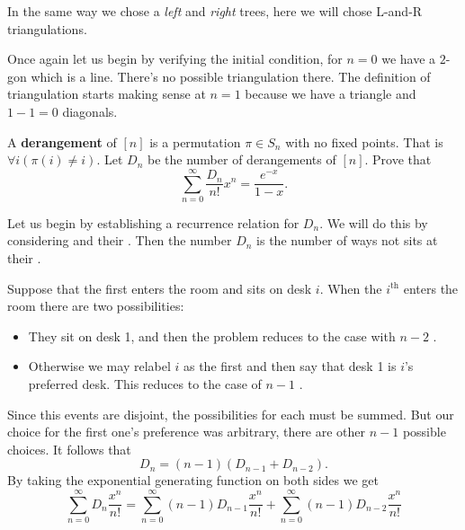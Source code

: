 \documentclass[12pt]{memoir}
\begin{document}
   \begin{ptcbr}
      In the same way we chose a \emph{left} and \emph{right} trees, here we will chose L-and-R triangulations.\par 
      Once again let us begin by verifying the initial condition, for $n=0$ we have a $2$-gon which is a line. There's no possible triangulation there. The definition of triangulation starts making sense at $n=1$ because we have a triangle and $1-1=0$ diagonals.  
      \end{ptcbr}

   \begin{Ej}[Exercise 8]
         A \textbf{derangement} of $[n]$ is a permutation $\pi\in S_n$ with no fixed points. That is $\forall i(\pi(i)\neq i)$. Let $D_n$ be the number of derangements of $[n]$. Prove that 
         $$\sum_{n=0}^\infty\frac{D_n}{n!}x^n=\frac{e^{-x}}{1-x}.$$  
         \end{Ej}
   \begin{ptcbr}
      Let us begin by establishing a recurrence relation for $D_n$. We will do this by considering  and their . Then the number $D_n$ is the number of ways not  sits at their .\par 
      Suppose that the first  enters the room and sits on desk $i$. When the $i^{\text{th}}$  enters the room there are two possibilities:
      \begin{itemize}
         \itemsep=-0.4em
         \item They sit on desk 1, and then the problem reduces to the case with $n-2$ .
         \item Otherwise we may relabel  $i$ as the first  and then say that desk 1 is $i$'s preferred desk. This reduces to the case of $n-1$ .
      \end{itemize}
      Since this events are disjoint, the possibilities for each must be summed. But our choice for the first one's preference was arbitrary, there are other $n-1$ possible choices. It follows that 
      $$D_n=(n-1)(D_{n-1}+D_{n-2}).$$
      By taking the exponential generating function on both sides we get 
      $$\sum_{n=0}^\infty D_n\frac{x^n}{n!}=\sum_{n=0}^\infty (n-1)D_{n-1}\frac{x^n}{n!}+\sum_{n=0}^\infty (n-1)D_{n-2}\frac{x^n}{n!}$$
   \end{ptcbr}
\end{document}
